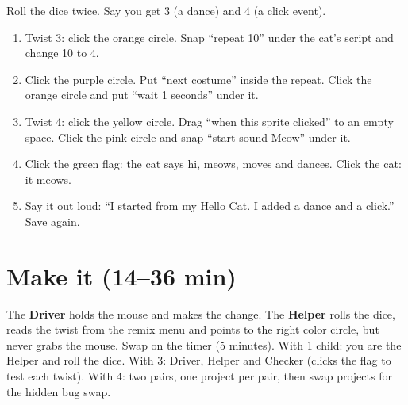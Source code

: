\begin{workedexample}
Roll the dice twice. Say you get 3 (a dance) and 4 (a click event).
\begin{enumerate}[leftmargin=1.4em,itemsep=1pt]
  \item Twist 3: click the orange  circle. Snap \enquote{repeat 10} under the cat's script and change 10 to 4.
  \item Click the purple  circle. Put \enquote{next costume} inside the repeat. Click the orange  circle and put \enquote{wait 1 seconds} under it.
  \item Twist 4: click the yellow  circle. Drag \enquote{when this sprite clicked} to an empty space. Click the pink  circle and snap \enquote{start sound Meow} under it.
  \item Click the green flag: the cat says hi, meows, moves and dances. Click the cat: it meows.
  \item Say it out loud: \enquote{I started from my Hello Cat. I added a dance and a click.} Save again.
\end{enumerate}
\begin{center}
\begin{scratch}[scale=0.85]
\end{scratch}
\quad
\begin{scratch}[scale=0.85]
\end{scratch}
\end{center}
\end{workedexample}

\section{Make it (14--36 min)}
\begin{pairroles}
The \textbf{Driver} holds the mouse and makes the change. The \textbf{Helper} rolls the dice, reads the twist from the remix menu and points to the right color circle, but never grabs the mouse. Swap on the timer (5 minutes). With 1 child: you are the Helper and roll the dice. With 3: Driver, Helper and Checker (clicks the flag to test each twist). With 4: two pairs, one project per pair, then swap projects for the hidden bug swap.
\end{pairroles}

